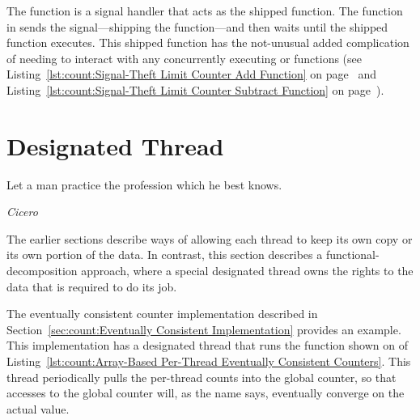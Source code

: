 The  function is a signal handler that
acts as the shipped function.
The  function in 
sends the signal---shipping the function---and then waits until
the shipped function executes.
This shipped function has the not-unusual added complication of
needing to interact with any concurrently executing 
or  functions (see
Listing~\ref{lst:count:Signal-Theft Limit Counter Add Function}
on
page~\pageref{lst:count:Signal-Theft Limit Counter Add Function} and
Listing~\ref{lst:count:Signal-Theft Limit Counter Subtract Function}
on
page~\pageref{lst:count:Signal-Theft Limit Counter Subtract Function}).

\QuickQuizEnd

\section{Designated Thread}
\label{sec:owned:Designated Thread}
%
\epigraph{Let a man practice the profession which he best knows.}
	 {\emph{Cicero}}

The earlier sections describe ways of allowing each thread to keep its
own copy or its own portion of the data.
In contrast, this section describes a functional-decomposition approach,
where a special designated thread owns the rights to the data
that is required to do its job.
\begin{fcvref}
The eventually consistent counter implementation described in
Section~\ref{sec:count:Eventually Consistent Implementation} provides an example.
This implementation has a designated thread that runs the
 function shown on  of
Listing~\ref{lst:count:Array-Based Per-Thread Eventually Consistent Counters}.
This  thread periodically pulls the per-thread counts
into the global counter, so that accesses to the global counter will,
as the name says, eventually converge on the actual value.
\end{fcvref}

